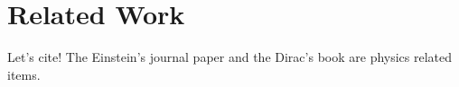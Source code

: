 \chapter{Related Work}
Let's cite! The Einstein's journal paper \cite{einstein} and the Dirac's 
book \cite{dirac} are physics related items. 